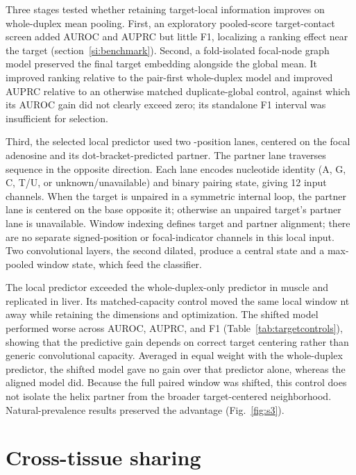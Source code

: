 \documentclass[9pt,twoside]{pnas-new}
\begin{document}
Three stages tested whether retaining target-local information improves on whole-duplex mean pooling. First, an exploratory pooled-score target-contact screen added AUROC and AUPRC but little F1, localizing a ranking effect near the target (section~\ref{si:benchmark}). Second, a fold-isolated focal-node graph model preserved the final target embedding alongside the global mean. It improved ranking relative to the pair-first whole-duplex model and improved AUPRC relative to an otherwise matched duplicate-global control, against which its AUROC gain did not clearly exceed zero; its standalone F1 interval was insufficient for selection.

Third, the selected local predictor used two \LocalWindowWidth{}-position lanes, centered on the focal adenosine and its dot-bracket-predicted partner. The partner lane traverses sequence in the opposite direction. Each lane encodes nucleotide identity (A, G, C, T/U, or unknown/unavailable) and binary pairing state, giving 12 input channels. When the target is unpaired in a symmetric internal loop, the partner lane is centered on the base opposite it; otherwise an unpaired target's partner lane is unavailable. Window indexing defines target and partner alignment; there are no separate signed-position or focal-indicator channels in this local input. Two convolutional layers, the second dilated, produce a central state and a max-pooled window state, which feed the classifier.

The local predictor exceeded the whole-duplex-only predictor in muscle and replicated in liver. Its matched-capacity control moved the same local window \LocalControlShift{} nt away while retaining the dimensions and optimization. The shifted model performed worse across AUROC, AUPRC, and F1 (Table~\ref{tab:targetcontrols}), showing that the predictive gain depends on correct target centering rather than generic convolutional capacity. Averaged in equal weight with the whole-duplex predictor, the shifted model gave no gain over that predictor alone, whereas the aligned model did. Because the full paired window was shifted, this control does not isolate the helix partner from the broader target-centered neighborhood. Natural-prevalence results preserved the advantage (Fig.~\ref{fig:s3}).



\section{Cross-tissue sharing}\label{si:cross-tissue}
\end{document}
